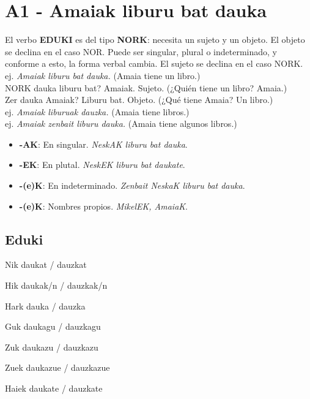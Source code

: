 \documentclass[11pt, a4paper]{article}
\begin{document}
\section{A1 - Amaiak liburu bat dauka}
El verbo \textbf{EDUKI} es del tipo \textbf{NORK}: necesita un sujeto y un objeto. El objeto se declina en el caso NOR. Puede ser singular, plural o indeterminado, y conforme a esto, la forma verbal cambia. El sujeto se declina en el caso NORK.\\

ej. \textit{Amaiak liburu bat dauka.} (Amaia tiene un libro.)\\
\indent \indent NORK dauka liburu bat? Amaiak. Sujeto. (¿Quién tiene un libro? Amaia.)\\
\indent \indent Zer dauka Amaiak? Liburu bat. Objeto.
(¿Qué tiene Amaia? Un libro.)\\
\indent ej. \textit{Amaiak liburuak dauzka.} (Amaia tiene libros.)\\
\indent ej. \textit{Amaiak zenbait liburu dauka.} (Amaia tiene algunos libros.)\\

\begin{itemize}
\item \textbf{-AK}: En singular. \textit{NeskAK liburu bat dauka}.
\item \textbf{-EK}: En plutal. \textit{NeskEK liburu bat daukate}.
\item \textbf{-(e)K}: En indeterminado. \textit{Zenbait NeskaK liburu bat dauka}.
\item \textbf{-(e)K}: Nombres propios. \textit{MikelEK, AmaiaK}.
\end{itemize}

\subsection{Eduki}
\begin{itemize}
\begin{multicols}{2}
\item Nik daukat / dauzkat
\item Hik daukak/n / dauzkak/n
\item Hark dauka / dauzka\\
\item Guk daukagu / dauzkagu
\item Zuk daukazu / dauzkazu
\item Zuek daukazue / dauzkazue
\item Haiek daukate / dauzkate
\end{multicols}
\end{itemize}
\end{document}
